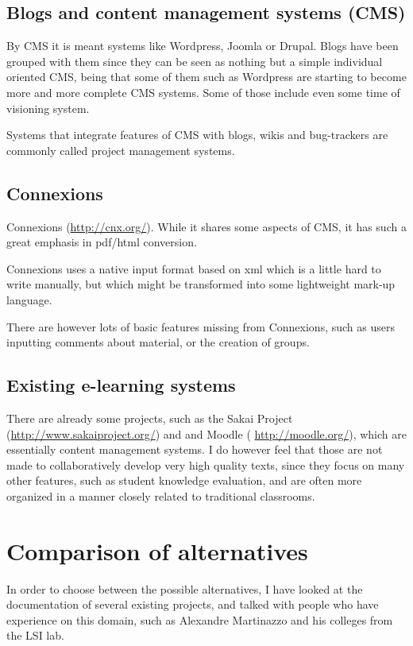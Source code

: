 \documentclass[12pt]{article}
\begin{document}
\subsection{Blogs and content management systems (CMS)}

By CMS it is meant systems like Wordpress, Joomla or Drupal. Blogs have been grouped with them since they can be seen as nothing but a simple individual oriented CMS, being that some of them such as Wordpress are starting to become more and more complete CMS systems. Some of those include even some time of visioning system.

Systems that integrate features of CMS with blogs, wikis and bug-trackers are commonly called project management systems.

\subsection{Connexions}

Connexions (\href{http://cnx.org/}{http://cnx.org/}). While it shares some aspects of CMS, it has such a great emphasis in pdf/html conversion.

Connexions uses a native input format based on xml which is a little hard to write manually, but which might be transformed into some lightweight mark-up language.

There are however lots of basic features missing from Connexions, such as users inputting comments about material, or the creation of groups.

\subsection{Existing e-learning systems} \label{sec-learning-websites}

There are already some projects, such as the Sakai Project (\url{http://www.sakaiproject.org/}) and and Moodle (
\url{http://moodle.org/}), which are essentially content management systems. I do however feel that those are not made to collaboratively develop very high quality texts, since they focus on many other features, such as student knowledge evaluation, and are often more organized in a manner closely related to traditional classrooms.

\section{Comparison of alternatives}

In order to choose between the possible alternatives, I have looked at the documentation of several existing projects, and talked with people who have experience on this domain, such as Alexandre Martinazzo and his colleges from the LSI lab.
\end{document}

